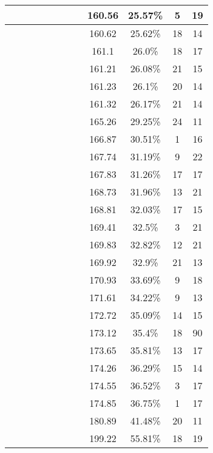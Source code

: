 \begin{center}
\begin{longtable}{|c|c|c|c|c|c|c|c|c|c|c|c|}
 \x &  &  &  &  \x &  \x &  \x &  \x & 160.56 & 25.57\% & 5 & 19 \\ \hline
 \x &  \x &  \x &  \x &  \x &  \x &  \x &  & 160.62 & 25.62\% & 18 & 14 \\ \hline
 \x &  &  \x &  \x &  \x &  \x &  \x &  & 161.1 & 26.0\% & 18 & 17 \\ \hline
 \x &  &  &  \x &  \x &  &  &  & 161.21 & 26.08\% & 21 & 15 \\ \hline
 \x &  &  \x &  &  \x &  \x &  \x &  \x & 161.23 & 26.1\% & 20 & 14 \\ \hline
 \x &  &  \x &  &  \x &  &  \x &  & 161.32 & 26.17\% & 21 & 14 \\ \hline
 \x &  &  &  \x &  \x &  &  \x &  \x & 165.26 & 29.25\% & 24 & 11 \\ \hline
 \x &  &  &  \x &  \x &  \x &  \x &  & 166.87 & 30.51\% & 1 & 16 \\ \hline
 \x &  &  &  \x &  &  \x &  \x &  & 167.74 & 31.19\% & 9 & 22 \\ \hline
 \x &  &  &  \x &  &  &  \x &  & 167.83 & 31.26\% & 17 & 17 \\ \hline
 \x &  \x &  &  \x &  \x &  \x &  \x &  & 168.73 & 31.96\% & 13 & 21 \\ \hline
 \x &  \x &  &  \x &  \x &  &  \x &  & 168.81 & 32.03\% & 17 & 15 \\ \hline
 \x &  \x &  \x &  &  \x &  \x &  \x &  \x & 169.41 & 32.5\% & 3 & 21 \\ \hline
 \x &  \x &  \x &  \x &  \x &  &  \x &  & 169.83 & 32.82\% & 12 & 21 \\ \hline
 \x &  &  &  \x &  \x &  \x &  \x &  \x & 169.92 & 32.9\% & 21 & 13 \\ \hline
 \x &  \x &  &  \x &  &  \x &  \x &  & 170.93 & 33.69\% & 9 & 18 \\ \hline
 \x &  &  \x &  \x &  \x &  \x &  \x &  \x & 171.61 & 34.22\% & 9 & 13 \\ \hline
 \x &  &  \x &  \x &  &  \x &  \x &  & 172.72 & 35.09\% & 14 & 15 \\ \hline
 \x &  &  &  &  \x &  \x &  \x &  & 173.12 & 35.4\% & 18 & 90 \\ \hline
 \x &  &  \x &  \x &  &  \x &  \x &  \x & 173.65 & 35.81\% & 13 & 17 \\ \hline
 \x &  \x &  \x &  \x &  \x &  \x &  \x &  \x & 174.26 & 36.29\% & 15 & 14 \\ \hline
 \x &  \x &  &  \x &  &  \x &  \x &  \x & 174.55 & 36.52\% & 3 & 17 \\ \hline
 \x &  &  &  \x &  &  \x &  \x &  \x & 174.85 & 36.75\% & 1 & 17 \\ \hline
 \x &  \x &  \x &  &  \x &  \x &  \x &  & 180.89 & 41.48\% & 20 & 11 \\ \hline
 \x &  \x &  &  &  \x &  \x &  \x &  \x & 199.22 & 55.81\% & 18 & 19 \\ \hline
\end{longtable}
\label{table:windProdInputParams}
\end{center}
\normalsize

